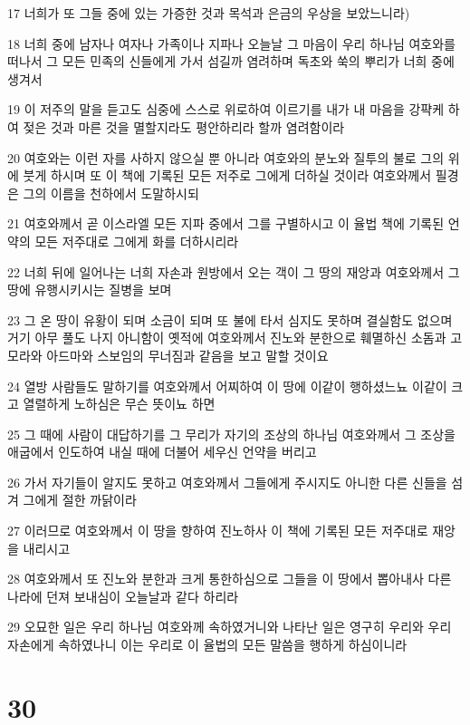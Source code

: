 \par 17 너희가 또 그들 중에 있는 가증한 것과 목석과 은금의 우상을 보았느니라)
\par 18 너희 중에 남자나 여자나 가족이나 지파나 오늘날 그 마음이 우리 하나님 여호와를 떠나서 그 모든 민족의 신들에게 가서 섬길까 염려하며 독초와 쑥의 뿌리가 너희 중에 생겨서
\par 19 이 저주의 말을 듣고도 심중에 스스로 위로하여 이르기를 내가 내 마음을 강퍅케 하여 젖은 것과 마른 것을 멸할지라도 평안하리라 할까 염려함이라
\par 20 여호와는 이런 자를 사하지 않으실 뿐 아니라 여호와의 분노와 질투의 불로 그의 위에 붓게 하시며 또 이 책에 기록된 모든 저주로 그에게 더하실 것이라 여호와께서 필경은 그의 이름을 천하에서 도말하시되
\par 21 여호와께서 곧 이스라엘 모든 지파 중에서 그를 구별하시고 이 율법 책에 기록된 언약의 모든 저주대로 그에게 화를 더하시리라
\par 22 너희 뒤에 일어나는 너희 자손과 원방에서 오는 객이 그 땅의 재앙과 여호와께서 그 땅에 유행시키시는 질병을 보며
\par 23 그 온 땅이 유황이 되며 소금이 되며 또 불에 타서 심지도 못하며 결실함도 없으며 거기 아무 풀도 나지 아니함이 옛적에 여호와께서 진노와 분한으로 훼멸하신 소돔과 고모라와 아드마와 스보임의 무너짐과 같음을 보고 말할 것이요
\par 24 열방 사람들도 말하기를 여호와께서 어찌하여 이 땅에 이같이 행하셨느뇨 이같이 크고 열렬하게 노하심은 무슨 뜻이뇨 하면
\par 25 그 때에 사람이 대답하기를 그 무리가 자기의 조상의 하나님 여호와께서 그 조상을 애굽에서 인도하여 내실 때에 더불어 세우신 언약을 버리고
\par 26 가서 자기들이 알지도 못하고 여호와께서 그들에게 주시지도 아니한 다른 신들을 섬겨 그에게 절한 까닭이라
\par 27 이러므로 여호와께서 이 땅을 향하여 진노하사 이 책에 기록된 모든 저주대로 재앙을 내리시고
\par 28 여호와께서 또 진노와 분한과 크게 통한하심으로 그들을 이 땅에서 뽑아내사 다른 나라에 던져 보내심이 오늘날과 같다 하리라
\par 29 오묘한 일은 우리 하나님 여호와께 속하였거니와 나타난 일은 영구히 우리와 우리 자손에게 속하였나니 이는 우리로 이 율법의 모든 말씀을 행하게 하심이니라

\chapter{30}

